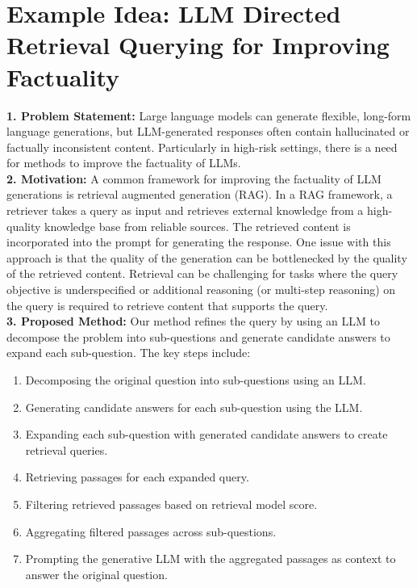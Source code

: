 \newpage 


\section{Example Idea: LLM Directed Retrieval Querying for Improving Factuality}
\label{sec:example_5}

\begin{tcolorbox}[colback=blue!5!white,colframe=blue!75!black,title=\textbf{LLM Directed Retrieval Querying for Improving Factuality (Part 1)}]
\small 
    \textbf{1. Problem Statement:} Large language models can generate flexible, long-form language generations, but LLM-generated responses often contain hallucinated or factually inconsistent content. Particularly in high-risk settings, there is a need for methods to improve the factuality of LLMs.
\\

    \textbf{2. Motivation:} A common framework for improving the factuality of LLM generations is retrieval augmented generation (RAG). In a RAG framework, a retriever takes a query as input and retrieves external knowledge from a high-quality knowledge base from reliable sources. The retrieved content is incorporated into the prompt for generating the response. One issue with this approach is that the quality of the generation can be bottlenecked by the quality of the retrieved content. Retrieval can be challenging for tasks where the query objective is underspecified or additional reasoning (or multi-step reasoning) on the query is required to retrieve content that supports the query.
\\

    \textbf{3. Proposed Method:} Our method refines the query by using an LLM to decompose the problem into sub-questions and generate candidate answers to expand each sub-question. The key steps include:
    \begin{enumerate}
        \item Decomposing the original question into sub-questions using an LLM.
        \item Generating candidate answers for each sub-question using the LLM.
        \item Expanding each sub-question with generated candidate answers to create retrieval queries.
        \item Retrieving passages for each expanded query.
        \item Filtering retrieved passages based on retrieval model score.
        \item Aggregating filtered passages across sub-questions.
        \item Prompting the generative LLM with the aggregated passages as context to answer the original question.
    \end{enumerate}



\end{tcolorbox}
